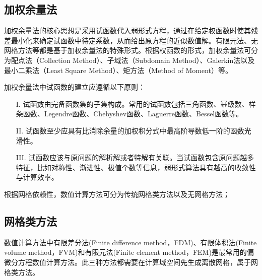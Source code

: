 \subsection{加权余量法}
\label{加权余量法}

加权余量法的核心思想是采用试函数代入弱形式方程，通过在给定权函数时使其残差最小化来确定试函数中待定系数，从而给出原方程的近似数值解。有限元法、无网格方法等都是基于加权余量法的特殊形式。根据权函数的形式，加权余量法可分为配点法（Collection Method）、子域法（Subdomain Method）、Galerkin法以及最小二乘法（Least Square Method）、矩方法（Method of Moment）等。

加权余量法中试函数的建立应遵循以下原则：

\begin{itemize}
\item[I.]试函数由完备函数集的子集构成。常用的试函数包括三角函数、幂级数、样条函数、Legendre函数、Chebyshev函数、Laguerre函数、Bessel函数等。
\item[II.]试函数至少应具有比消除余量的加权积分式中最高阶导数低一阶的函数光滑性。
\item[III.]试函数应该与原问题的解析解或者特解有关联。当试函数包含原问题越多特征，比如对称性、渐进性、极值个数等信息，弱形式算法具有越高的收敛性与计算效率。
\end{itemize}

根据网格依赖性，数值计算方法可分为传统网格类方法以及无网格方法；

\subsection{网格类方法}
\label{网格类方法}

数值计算方法中有限差分法(Finite difference method，FDM)、有限体积法(Finite volume method，FVM)和有限元法(Finite element method，FEM)是最常用的偏微分方程数值计算方法。此三种方法都需要在计算域空间先生成离散网格，属于网格类方法。

